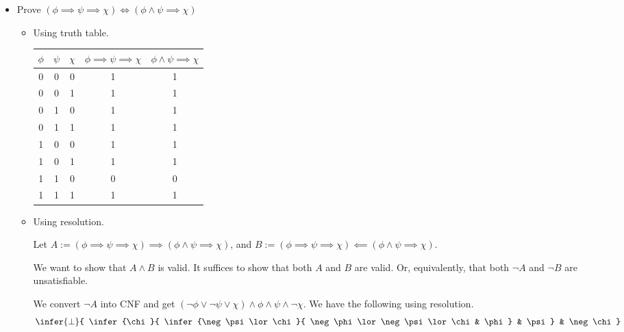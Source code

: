 \begin{itemize}
    \item[Problem 2.] Prove $(\phi \implies \psi \implies \chi) \iff (\phi \land \psi \implies \chi)$
    \begin{itemize}
        \item[(a)] Using truth table.
            \begin{center}
                \begin{tabular}{ |c|c|c||c|c| }
                    \hline
                    $\phi$ & $\psi$ & $\chi$ & $\phi \implies \psi \implies \chi$ & $\phi \land \psi \implies \chi$ \\
                    \hline \hline
                    0 & 0 & 0 & 1 & 1 \\
                    \hline
                    0 & 0 & 1 & 1 & 1 \\
                    \hline
                    0 & 1 & 0 & 1 & 1 \\
                    \hline
                    0 & 1 & 1 & 1 & 1 \\
                    \hline
                    1 & 0 & 0 & 1 & 1 \\
                    \hline
                    1 & 0 & 1 & 1 & 1 \\
                    \hline
                    1 & 1 & 0 & 0 & 0 \\
                    \hline
                    1 & 1 & 1 & 1 & 1 \\
                    \hline
                \end{tabular}
            \end{center}
        
        \item[(b)] Using resolution.
        
        Let $A := (\phi \implies \psi \implies \chi) \implies (\phi \land \psi \implies \chi)$, and $B := (\phi \implies \psi \implies \chi) \impliedby (\phi \land \psi \implies \chi)$. 
        
        We want to show that $A \land B$ is valid. 
        It suffices to show that both $A$ and $B$ are valid. Or, equivalently, that both $\neg A$ and $\neg B$ are unsatisfiable. 
        
        We convert $\neg A$ into CNF and get $(\neg \phi \lor \neg \psi \lor \chi) \land \phi \land \psi \land \neg \chi$. We have the following using resolution. 
        \[
            \infer{\bot}{
                \infer{\chi}{
                    \infer{\neg \psi \lor \chi}{
                        \neg \phi \lor \neg \psi \lor \chi & \phi}
                & \psi
                }
            & \neg \chi
            }
        \]


\end{itemize}
\end{itemize}
